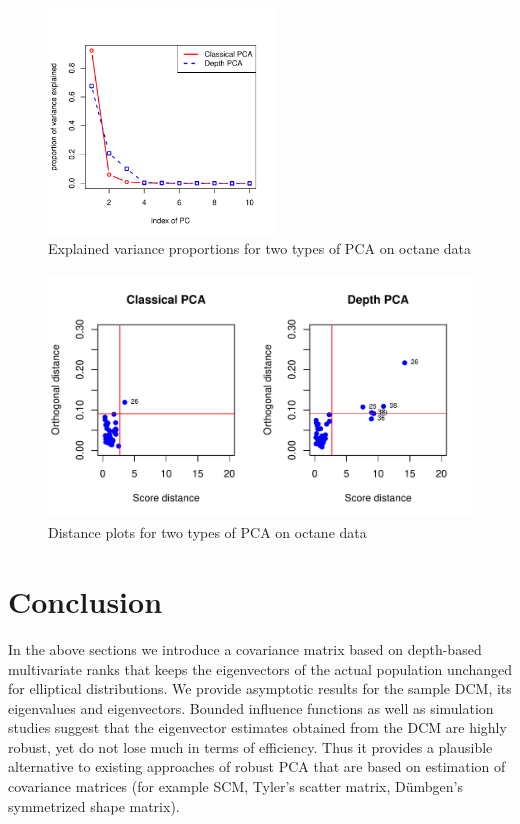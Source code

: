 \documentclass[fleqn,11pt]{article}
\begin{document}
\begin{figure}[t]
	\centering
		\includegraphics[height=6cm]{octane_screeplot}
	\caption{Explained variance proportions for two types of PCA on octane data}
	\label{fig:screeplot}
\end{figure}
\begin{figure}[t]
	\centering
		\includegraphics[height=6.5cm]{octane_distanceplot}
	\caption{Distance plots for two types of PCA on octane data}
	\label{fig:distplot}
\end{figure}

\section{Conclusion}\label{section:sec7}

In the above sections we introduce a covariance matrix based on depth-based multivariate ranks that keeps the eigenvectors of the actual population unchanged for elliptical distributions. We provide asymptotic results for the sample DCM, its eigenvalues and eigenvectors. Bounded influence functions as well as simulation studies suggest that the eigenvector estimates obtained from the DCM are highly robust, yet do not lose much in terms of efficiency. Thus it provides a plausible alternative to existing approaches of robust PCA that are based on estimation of covariance matrices (for example SCM, Tyler's scatter matrix, D\"{u}mbgen's symmetrized shape matrix).
\end{document}
